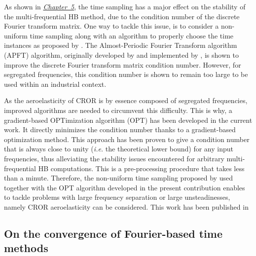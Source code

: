 As shown in \hyperref[cha:limitations_condition_number]{\emph{Chapter~5}},
the time sampling has a major effect on the
stability of the multi-frequential HB 
method, due to the condition number of the discrete Fourier
transform matrix. One way to tackle this issue, 
is to consider a non-uniform time sampling
along with an algorithm to properly choose the time instances
as proposed by \citet{ThesisGuedeney}.
The Almost-Periodic Fourier Transform algorithm (APFT) 
algorithm, originally developed by \citet{Kundert1988} and implemented by 
\citet{ThesisGuedeney}, is shown to improve the discrete
Fourier transform matrix condition number.
However, for segregated frequencies, this condition number
is shown to remain too large to be used within an industrial context.

As the aeroelasticity of CROR is by essence
composed of segregated frequencies, improved algorithms are needed
to circumvent this difficulty.
This is why, a gradient-based OPTimization algorithm (OPT) 
has been developed in the current work.
It directly minimizes the condition number thanks to a
gradient-based optimization method. This approach has 
been proven to
give a condition number that is always close to unity (\emph{i.e.} the
theoretical lower bound) for any input frequencies,
thus alleviating the stability issues encountered for arbitrary
multi-frequential HB computations.
This is a pre-processing procedure
that takes less than a minute.
Therefore, the non-uniform time sampling proposed by \citet{ThesisGuedeney}
used together with the OPT algorithm 
developed in the present contribution
enables to tackle problems with large frequency 
separation or large unsteadinesses, namely CROR aeroelasticity
can be considered.
This work has been published in
\begin{quote}
\end{quote}


\subsection*{On the convergence of Fourier-based time methods}

